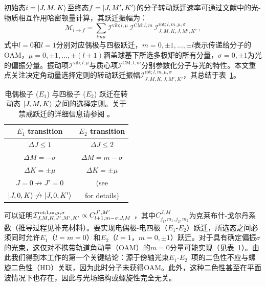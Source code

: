 \documentclass[reprint,aps,prl,twocolumn,superscriptaddress,groupedaddress]{revtex4-2}
\newcommand{\eoet}{$E_1$-$E_2$}
\begin{document}
初始态$i=\ket{J,M,K}$至终态$f=\ket{J,M',K'}$的分子转动跃迁速率可通过文献\cite{Maslov2024,Maslov_Thesis}中的光-物质相互作用哈密顿量计算，其跃迁振幅为：
\begin{equation}
    \mathcal{M}_{i\to f}=\sum_{lm\mu}\mathcal{I}^{\text{vib}; l,\mu}\,\mathcal{I}^{\text{CM}; l,m}\,\mathcal{I}^{\text{rot}; l,m,\mu,\sigma}_{J,M,K,J,M',K'}\,,
    \label{eq_transition_matrix}
\end{equation}
式中$l=0$和$l=1$分别对应偶极与四极跃迁，$m = 0, \pm 1, \dots, \pm l$表示传递给分子的OAM，$\mu = 0, \pm 1, \dots, \pm (l+1)$涵盖球基下所选多极矩的所有分量，$\sigma =0, \pm 1$为光的偏振分量。振动项$\mathcal{I}^{\text{vib}; l,\mu}$与质心项$\mathcal{I}^{\text{CM}; l,m}$分别参数化分子与光的特性。本文重点关注决定角动量选择定则的转动跃迁振幅$\mathcal{I}^{\text{rot};l,m,\mu,\sigma}_{J,M,K,J,M',K'}$，其总结于表~\ref{SelectionRules}。
\begin{table}[ht!]
    \centering
    \begin{tabular}{c c}\hline
    \toprule
        \textbf{$E_1$ transition} & \textbf{$E_2$ transition}  \\
        \midrule
        $\Delta J\leq 1$ &  $\Delta J\leq 2$ \\
        $\Delta M=-\sigma$ & $\Delta M=m-\sigma$ \\
        $\Delta K=\pm\mu$ & $\Delta K=\pm\mu$ \\
        $J=0\not\to J'=0$ &  (see \cite{Note1}\\
        $\ket{J,0,K}\not\to\ket{J,0,K'}$ &  for details)\\
    \bottomrule
\hline
    \end{tabular}
    \caption{电偶极子 ($E_1$) 与四极子 ($E_2$) 跃迁在转动态 $\ket{J,M,K}$ 之间的选择定则。关于禁戒跃迁的详细信息请参阅 \cite{Note1}。}
    \label{SelectionRules}
\end{table}
可以证明$\mathcal{I}^{\rm rot; l, m, \mu, \sigma}_{J, M, K, J', M', K'} \propto C^{J',M'}_{l+1, m-\sigma; J, M}$ \cite{Maslov2024,Maslov_Thesis}，其中$C^{J, M}_{j_1, m_1, j_2, m_2}$为克莱布什-戈尔丹系数（推导过程见补充材料\cite{Note1}）。要实现电偶极-电四极（\eoet）跃迁，所选态之间必须同时允许$E_1$（$l=m=0$）和$E_2$（$l = 1$，$m = 0, \pm 1$）跃迁。对于具有确定偏振$\sigma$的光束，这仅对不携带轨道角动量（OAM）的$m = 0$分量可能实现（见表~\ref{SelectionRules}）。由此我们得到本工作的第一个关键结论：源于傍轴光束\eoet~项的二色性不应与螺旋二色性（HD）关联，因为此时分子未获得OAM。此外，这种二色性甚至在平面波情况下也存在，因此与光场结构或螺旋性完全无关。
\end{document}
